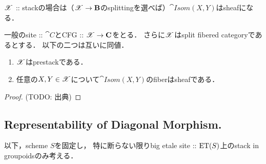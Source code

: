 \documentclass[a4paper, dvipdfmx]{jsarticle}
\newcommand{\Isom}{\cat{Isom}}
\begin{document}
$\mathscr{X}$ :: stackの場合は（$\mathscr{X} \to \mathbf{B}$のsplittingを選べば）$\Isom(X, Y)$はsheafになる．
\begin{Lemma}
    一般のsite :: $\cat{C}$とCFG :: $\mathscr{X} \to \mathbf{C}$をとる．
    さらに$\mathscr{X}$はsplit fibered categoryであるとする．
    以下の二つは互いに同値．
    \begin{enumerate}
        \item $\mathscr{X}$はprestackである．
        \item 任意の$X, Y \in \mathscr{X}$について$\Isom(X, Y)$のfiberはsheafである．
    \end{enumerate}
\end{Lemma}
\begin{proof}
    (TODO: 出典)
\end{proof}

\subsection{Representability of Diagonal Morphism.}
\begin{Remark}
    以下，scheme $S$を固定し，
    特に断らない限りbig etale site :: $\mathrm{ET}(S)$上のstack in groupoidsのみ考える．
\end{Remark}
\end{document}

